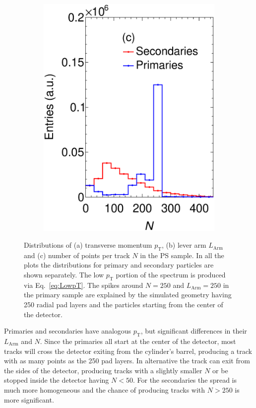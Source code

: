 \begin{figure}[t]
\begin{subfigure}[b]{0.32\textwidth}
         \includegraphics[width=\textwidth]{figures/ch5-KF_NDGAr/ToySample/testTPCMirrorNAllTall.eps}
         \caption{}
         \label{fig:NTPC}
     \end{subfigure}
        \caption{Distributions of (a) transverse momentum $p_{\textrm{T}}$,  (b) lever arm $L_{\textrm{Arm}}$ and (c) number of points per track $N$ in the PS sample. In all the plots the distributions for primary and secondary particles are shown separately. The low $p_{\textrm{T}}$ portion of the spectrum 
 is produced via Eq.~\ref{eq:LowpT}. The spikes around $N=250$ and $L_{\textrm{Arm}}=250$ in the primary sample are explained by the simulated geometry having 250 radial pad layers and the particles starting from the center of the detector. } \label{fig:TPCProperties}
\end{figure}

Primaries and secondaries have analogous $p_{\textrm{T}}$, but significant differences in their $L_{\textrm{Arm}}$ and $N$. Since the primaries all start at the center of the detector, most tracks will cross the detector exiting from the cylinder's barrel, producing a track with as many points as the 250 pad layers. In alternative the track can exit from the sides of the detector, producing tracks with a slightly smaller $N$ or be stopped inside the detector having $N<50$. For the secondaries the spread is much more homogeneous and the chance of producing tracks with $N>250$ is more significant.

